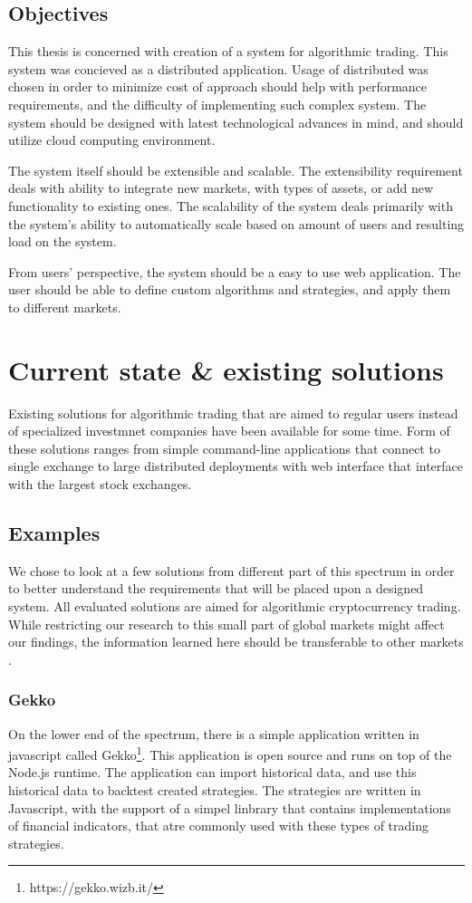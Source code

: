 \section{Objectives}
This thesis is concerned with creation of a system for algorithmic trading. This system was concieved
as a distributed application. Usage of distributed was chosen in order to minimize cost of
approach should help with performance requirements,
and the difficulty of implementing such complex system. The system should be designed with latest technological advances in mind, and
should utilize cloud computing environment.

The system itself should be extensible and scalable. The extensibility requirement deals with ability to integrate new markets,
with types of assets, or add new functionality to existing ones. The scalability of the system deals primarily with the system's
ability to automatically scale based on amount of users and resulting load on the system.

From users' perspective, the system should be a easy to use web application. The user should be able to define custom
algorithms and strategies, and apply them to different markets.

\chapter{Current state \& existing solutions}
\label{chapter:current_state}
Existing solutions for algorithmic trading that are aimed to regular users instead of specialized investmnet companies
have been available for some time. Form of these solutions ranges from simple command-line applications that connect to single exchange
to large distributed deployments with web interface that interface with the largest stock exchanges\cite{Agopyan_financialbusiness}.

\section{Examples}
We chose to look at a few solutions from different part of this spectrum in order to better understand the requirements
that will be placed upon a designed system. All evaluated solutions are aimed for algorithmic cryptocurrency trading. While
restricting our research to this small part of global markets might affect our findings, the information learned here
should be transferable to other markets .

\subsection{Gekko}
On the lower end of the spectrum, there is a simple application written in javascript called Gekko\footnote{https://gekko.wizb.it/}.
This application is open source and runs on top of the Node.js runtime. The application can import historical data,
and use this historical data to backtest created strategies. The strategies are written in Javascript, with the support
of a simpel linbrary that contains implementations of financial indicators, that atre commonly used with these types
of trading strategies.

